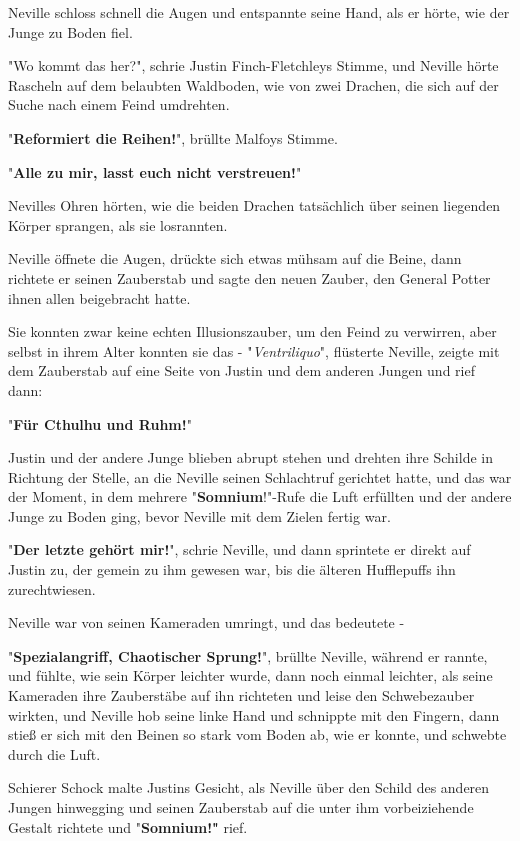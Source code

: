 {Neville schloss schnell die Augen und entspannte seine Hand, als er hörte, wie der Junge zu Boden fiel.

"Wo kommt das her?", schrie Justin Finch-Fletchleys Stimme, und Neville hörte Rascheln auf dem belaubten Waldboden, wie von zwei Drachen, die sich auf der Suche nach einem Feind umdrehten.

"\textbf{Reformiert die Reihen!}", brüllte Malfoys Stimme.

"\textbf{Alle zu mir, lasst euch nicht verstreuen!}"

Nevilles Ohren hörten, wie die beiden Drachen tatsächlich über seinen liegenden Körper sprangen, als sie losrannten.

Neville öffnete die Augen, drückte sich etwas mühsam auf die Beine, dann richtete er seinen Zauberstab und sagte den neuen Zauber, den General Potter ihnen allen beigebracht hatte.

Sie konnten zwar keine echten Illusionszauber, um den Feind zu verwirren, aber selbst in ihrem Alter konnten sie das - "\emph{Ventriliquo}", flüsterte Neville, zeigte mit dem Zauberstab auf eine Seite von Justin und dem anderen Jungen und rief dann:

"\textbf{Für Cthulhu und Ruhm!}"

Justin und der andere Junge blieben abrupt stehen und drehten ihre Schilde in Richtung der Stelle, an die Neville seinen Schlachtruf gerichtet hatte, und das war der Moment, in dem mehrere "\textbf{Somnium}!"-Rufe die Luft erfüllten und der andere Junge zu Boden ging, bevor Neville mit dem Zielen fertig war.

"\textbf{Der letzte gehört mir!}", schrie Neville, und dann sprintete er direkt auf Justin zu, der gemein zu ihm gewesen war, bis die älteren Hufflepuffs ihn zurechtwiesen.

Neville war von seinen Kameraden umringt, und das bedeutete -

"\textbf{Spezialangriff, Chaotischer Sprung!}", brüllte Neville, während er rannte, und fühlte, wie sein Körper leichter wurde, dann noch einmal leichter, als seine Kameraden ihre Zauberstäbe auf ihn richteten und leise den Schwebezauber wirkten, und Neville hob seine linke Hand und schnippte mit den Fingern, dann stieß er sich mit den Beinen so stark vom Boden ab, wie er konnte, und schwebte durch die Luft.

Schierer Schock malte Justins Gesicht, als Neville über den Schild des anderen Jungen hinwegging und seinen Zauberstab auf die unter ihm vorbeiziehende Gestalt richtete und "\textbf{Somnium!"} rief.

}
